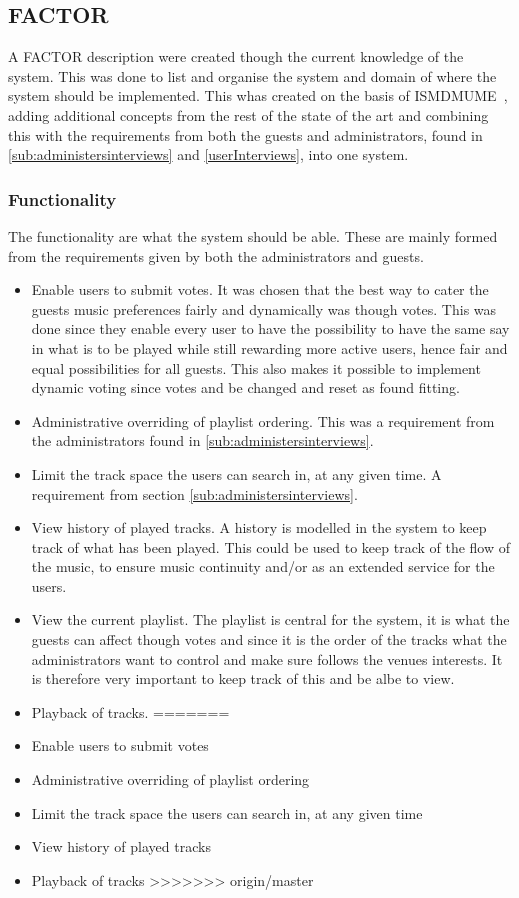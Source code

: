 \subsection{FACTOR}
A FACTOR description were created though the current knowledge of the system. This was done to list and organise the system and domain of where the system should be implemented.
This whas created on the basis of ISMDMUME~\cite{soerensen2004}, adding additional concepts from the rest of the state of the art and combining this with the requirements from both the guests and administrators, found in \cref{sub:administersinterviews} and \cref{userInterviews}, into one system. 
\subsubsection{Functionality}
The functionality are what the system should be able. These are mainly formed from the requirements given by both the administrators and guests.
\begin{itemize}
<<<<<<< HEAD
    \item Enable users to submit votes. It was chosen that the best way to cater the guests music preferences fairly and dynamically was though votes. This was done since they enable every user to have the possibility to have the same say in what is to be played while still rewarding more active users, hence fair and equal possibilities for all guests. This also makes it possible to implement dynamic voting since votes and be changed and reset as found fitting.
    \item Administrative overriding of playlist ordering. This was a requirement from the administrators found in \cref{sub:administersinterviews}.
    \item Limit the track space the users can search in, at any given time. A requirement from section \cref{sub:administersinterviews}.
    \item View history of played tracks. A history is modelled in the system to keep track of what has been played. This could be used to keep track of the flow of the music, to ensure music continuity and/or as an extended service for the users.
		\item View the current playlist. The playlist is central for the system, it is what the guests can affect though votes and since it is the order of the tracks what the administrators want to control and make sure follows the venues interests. It is therefore very important to keep track of this and be albe to view.
    \item Playback of tracks.
=======
  \item Enable users to submit votes
  \item Administrative overriding of playlist ordering
  \item Limit the track space the users can search in, at any given time
  \item View history of played tracks
  \item Playback of tracks
>>>>>>> origin/master
\end{itemize}

